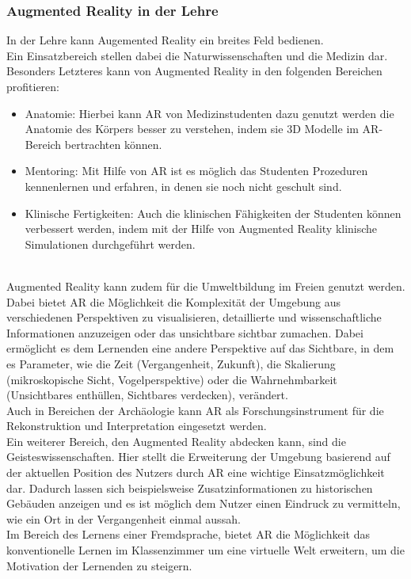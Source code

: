 \subsubsection{Augmented Reality in der Lehre}
In der Lehre kann Augemented Reality ein breites Feld bedienen.\\
Ein Einsatzbereich stellen dabei die Naturwissenschaften und die Medizin dar.
Besonders Letzteres kann von Augmented Reality in den folgenden Bereichen profitieren:
\begin{itemize}
\item Anatomie: Hierbei kann AR von Medizinstudenten dazu genutzt werden die Anatomie des Körpers besser zu verstehen, indem sie 3D Modelle im AR-Bereich bertrachten können.
\item Mentoring: Mit Hilfe von AR ist es möglich das Studenten Prozeduren kennenlernen und erfahren, in denen sie noch nicht geschult sind. 
\item Klinische Fertigkeiten: Auch die klinischen Fähigkeiten der Studenten können verbessert werden, indem mit der Hilfe von Augmented Reality klinische Simulationen durchgeführt werden.
\end{itemize}
\citep[Kapitel 7-9]{geroimenko:ar-in-education} \\
Augmented Reality kann zudem für die Umweltbildung im Freien genutzt werden. Dabei bietet AR die Möglichkeit die Komplexität der Umgebung aus verschiedenen Perspektiven zu visualisieren, detaillierte und wissenschaftliche Informationen anzuzeigen oder das \glqq unsichtbare\grqq{} sichtbar zumachen.
Dabei ermöglicht es dem Lernenden eine andere Perspektive auf das Sichtbare, in dem es Parameter, wie die Zeit (Vergangenheit, Zukunft), die Skalierung (mikroskopische Sicht, Vogelperspektive) oder die Wahrnehmbarkeit (Unsichtbares enthüllen, Sichtbares verdecken), verändert. \citep[Kapitel 17]{geroimenko:ar-in-education}\\
Auch in Bereichen der Archäologie kann AR als Forschungsinstrument für die Rekonstruktion und Interpretation eingesetzt werden. \citep[Kapitel 17]{geroimenko:ar-in-education}\\
Ein weiterer Bereich, den Augmented Reality abdecken kann, sind die Geisteswissenschaften.
Hier stellt die Erweiterung der Umgebung basierend auf der aktuellen Position des Nutzers durch AR eine wichtige Einsatzmöglichkeit dar. Dadurch lassen sich beispielsweise Zusatzinformationen zu historischen Gebäuden anzeigen und es ist möglich dem Nutzer einen Eindruck zu vermitteln, wie ein Ort in der Vergangenheit einmal aussah. \citep[Kapitel 11-12]{geroimenko:ar-in-education}\\
Im Bereich des Lernens einer Fremdsprache, bietet AR die Möglichkeit das konventionelle Lernen im Klassenzimmer um eine virtuelle Welt erweitern, um die Motivation der Lernenden zu steigern. \citep[Kapitel 11-12]{geroimenko:ar-in-education}

